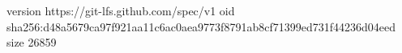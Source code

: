 version https://git-lfs.github.com/spec/v1
oid sha256:d48a5679ca97f921aa11c6ac0aea9773f8791ab8cf71399ed731f44236d04eed
size 26859
